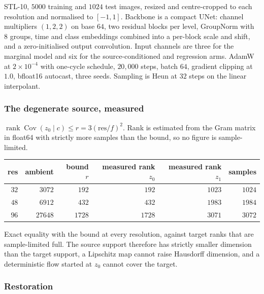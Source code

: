 \documentclass[11pt]{article}
\begin{document}
STL-10, $5000$ training and $1024$ test images, resized and centre-cropped to each resolution and
normalised to $[-1,1]$. Backbone is a compact UNet: channel multipliers $(1,2,2)$ on base $64$,
two residual blocks per level, GroupNorm with $8$ groups, time and class embeddings combined into
a per-block scale and shift, and a zero-initialised output convolution. Input channels are three
for the marginal model and six for the source-conditioned and regression arms. AdamW at
$2\times10^{-4}$ with one-cycle schedule, $20{,}000$ steps, batch $64$, gradient clipping at
$1.0$, bfloat16 autocast, three seeds. Sampling is Heun at $32$ steps on the linear interpolant.

\subsubsection*{The degenerate source, measured}

$\operatorname{rank}\operatorname{Cov}(z_0\mid c)\le r=3(\mathrm{res}/f)^2$. Rank is estimated
from the Gram matrix in float64 with strictly more samples than the bound, so no figure is
sample-limited.

\begin{center}
\begin{tabular}{@{}rrrrrr@{}}
\toprule
res & ambient & bound $r$ & measured rank $z_0$ & measured rank $z_1$ & samples\\
\midrule
$32$ & $3072$ & $192$ & $192$ & $1023$ & $1024$\\
$48$ & $6912$ & $432$ & $432$ & $1983$ & $1984$\\
$96$ & $27648$ & $1728$ & $1728$ & $3071$ & $3072$\\
\bottomrule
\end{tabular}
\end{center}

Exact equality with the bound at every resolution, against target ranks that are sample-limited
full. The source support therefore has strictly smaller dimension than the target support, a
Lipschitz map cannot raise Hausdorff dimension, and a deterministic flow started at $z_0$ cannot
cover the target.

\subsubsection*{Restoration}
\end{document}
